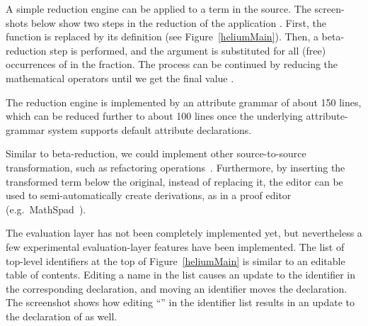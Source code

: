 

%


A simple reduction engine can be applied to a term in the source. The screen-shots below show two steps in the reduction of the application . First, the function  is replaced by its definition (see Figure~\ref{heliumMain}). Then, a beta-reduction step is performed, and the argument  is substituted for all (free) occurrences of  in the fraction. The process can be continued by reducing the mathematical operators until we get the final value .

 \then
 \then


The reduction engine is implemented by an attribute grammar of about 150 lines, which can be reduced further to about 100 lines once the underlying attribute-grammar system supports default attribute declarations.

Similar to beta-reduction, we could implement other source-to-source transformation, such as refactoring operations~\cite{reinke03refactoring}. Furthermore, by inserting the transformed term below the original, instead of replacing it, the editor can be used to semi-automatically create derivations, as in a proof editor (e.g.\   MathSpad~\cite{verhoeven00mathspad}).


The evaluation layer has not been completely implemented yet, but nevertheless a few experimental evaluation-layer features have been implemented. The list of top-level identifiers at the top of Figure~\ref{heliumMain} is similar to an editable table of contents. Editing a name in the list causes an update to the identifier in the corresponding declaration, and moving an identifier moves the declaration. The screenshot shows how editing ``'' in the identifier list results in an update to the declaration of  as well.


